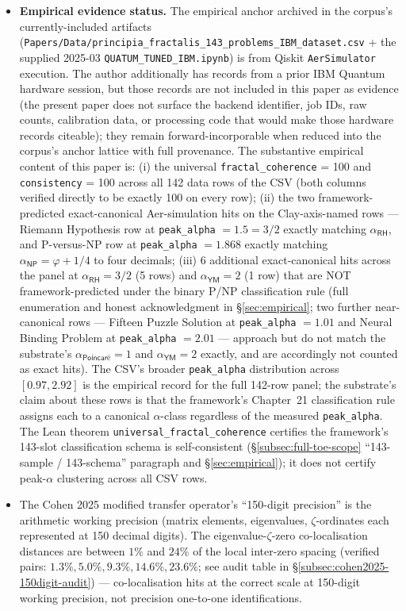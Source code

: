 \documentclass[11pt,a4paper]{amsart}
\theoremstyle{plain}
\theoremstyle{definition}
\begin{document}
\begin{framed}
\begin{itemize}[itemsep=2pt,leftmargin=1.4em]
\item \textbf{Empirical evidence status.} The empirical anchor archived in the corpus's currently-included artifacts (\texttt{Papers/Data/principia\_fractalis\_143\_problems\_IBM\_dataset.csv} + the supplied 2025-03 \texttt{QUATUM\_TUNED\_IBM.ipynb}) is from Qiskit \texttt{AerSimulator} execution. The author additionally has records from a prior IBM Quantum hardware session, but those records are not included in this paper as evidence (the present paper does not surface the backend identifier, job IDs, raw counts, calibration data, or processing code that would make those hardware records citeable); they remain forward-incorporable when reduced into the corpus's anchor lattice with full provenance. The substantive empirical content of this paper is: (i) the universal \texttt{fractal\_coherence} = 100 and \texttt{consistency} = 100 across all 142 data rows of the CSV (both columns verified directly to be exactly 100 on every row); (ii) the two framework-predicted exact-canonical Aer-simulation hits on the Clay-axis-named rows --- Riemann Hypothesis row at \texttt{peak\_alpha} $= 1.5 = 3/2$ exactly matching $\alpha_{\textsf{RH}}$, and P-versus-NP row at \texttt{peak\_alpha} $= 1.868$ exactly matching $\alpha_{\textsf{NP}} = \varphi + 1/4$ to four decimals; (iii) 6 additional exact-canonical hits across the panel at $\alpha_{\textsf{RH}} = 3/2$ (5 rows) and $\alpha_{\textsf{YM}} = 2$ (1 row) that are NOT framework-predicted under the binary P/NP classification rule (full enumeration and honest acknowledgment in \S\ref{sec:empirical}; two further near-canonical rows --- Fifteen Puzzle Solution at \texttt{peak\_alpha} $= 1.01$ and Neural Binding Problem at \texttt{peak\_alpha} $= 2.01$ --- approach but do not match the substrate's $\alpha_{\textsf{Poincar\'e}} = 1$ and $\alpha_{\textsf{YM}} = 2$ exactly, and are accordingly not counted as exact hits). The CSV's broader \texttt{peak\_alpha} distribution across $[0.97, 2.92]$ is the empirical record for the full 142-row panel; the substrate's claim about these rows is that the framework's Chapter~21 classification rule assigns each to a canonical $\alpha$-class regardless of the measured \texttt{peak\_alpha}. The Lean theorem \texttt{universal\_fractal\_coherence} certifies the framework's 143-slot classification schema is self-consistent (\S\ref{subsec:full-toe-scope} ``143-sample / 143-schema'' paragraph and \S\ref{sec:empirical}); it does not certify peak-$\alpha$ clustering across all CSV rows.
\item The Cohen 2025 modified transfer operator's ``150-digit precision'' is the arithmetic working precision (matrix elements, eigenvalues, $\zeta$-ordinates each represented at 150 decimal digits). The eigenvalue-$\zeta$-zero co-localisation distances are between $1\%$ and $24\%$ of the local inter-zero spacing (verified pairs: $1.3\%, 5.0\%, 9.3\%, 14.6\%, 23.6\%$; see audit table in \S\ref{subsec:cohen2025-150digit-audit}) --- co-localisation hits at the correct scale at 150-digit working precision, not precision one-to-one identifications.

\end{itemize}
\end{framed}
\end{document}
